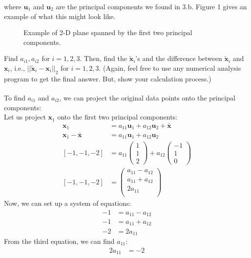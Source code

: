 \documentclass[a3paper,12pt]{extarticle} %
\begin{document}
\begin{enumerate}
where $\mathbf{u}_1$ and $\mathbf{u}_2$ are the principal components we found in 3.b. Figure 1 gives an example of what this might look like.

\begin{figure}[h]
\centering
\caption{Example of 2-D plane spanned by the first two principal components.}
\end{figure}

Find $a_{i1}, a_{i2}$ for $i = 1, 2, 3$. Then, find the $\tilde{\mathbf{x}}_i$'s and the difference between $\tilde{\mathbf{x}}_i$ and $\mathbf{x}_i$, i.e., $||\tilde{\mathbf{x}}_i - \mathbf{x}_i||_2$ for $i = 1, 2, 3$. (Again, feel free to use any numerical analysis program to get the final answer. But, show your calculation process.)
\\\\ To find $a_{i1}$ and $a_{i2}$, we can project the original data points onto the principal components:
\\ Let us project $\mathbf{x}_1$ onto the first two principal components:
\begin{align}
\mathbf{x}_1 &= a_{11}\mathbf{u}_1 + a_{12}\mathbf{u}_2 + \bar{\mathbf{x}}\\
\mathbf{x}_1 - \bar{\mathbf{x}} &= a_{11}\mathbf{u}_1 + a_{12}\mathbf{u}_2\\
[-1, -1, -2] &= a_{11}\begin{pmatrix}
1\\
1\\
2
\end{pmatrix} + a_{12}\begin{pmatrix}
-1\\
1\\
0
\end{pmatrix}\\
[-1, -1, -2] &= \begin{pmatrix}
a_{11} - a_{12}\\
a_{11} + a_{12}\\
2a_{11}\\
\end{pmatrix}
\end{align}
Now, we can set up a system of equations:
\begin{align}
-1 &= a_{11} - a_{12}\\
-1 &= a_{11} + a_{12}\\
-2 &= 2a_{11}
\end{align}
From the third equation, we can find $a_{11}$:
\begin{align}
2a_{11} &= -2\\

\end{align}
\end{enumerate}
\end{document}
